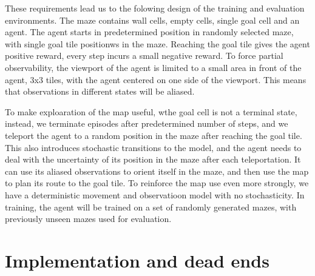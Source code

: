 \documentclass[12pt]{article}
\begin{document}
These requirements lead us to the folowing design of the training and evaluation environments. The maze contains wall cells, empty cells, single goal cell and an agent. The agent starts in predetermined position in randomly selected maze, with single goal tile positionws in the maze. Reaching the goal tile gives the agent positive reward, every step incurs a small negative reward. To force partial observability, the viewport of the agent is limited to a small area in front of the agent, 3x3 tiles, with the agent centered on one side of the viewport. This means that observations in different states will be aliased. 

To make exploaration of the map useful, wthe goal cell is not a terminal state, instead, we terminate episodes after predetermined number of steps, and we teleport the agent to a random position in the maze after reaching the goal tile. This also introduces stochastic transitions to the model, and the agent needs to deal with the uncertainty of its position in the maze after each teleportation. It can use its aliased observations to orient itself in the maze, and then use the map to plan its route to the goal tile. To reinforce the map use even more strongly, we have a deterministic movement and observatioon model with no stochasticity. In training, the agent will be trained on a set of randomly generated mazes, with previously unseen mazes used for evaluation.

\section{Implementation and dead ends}
\end{document}
